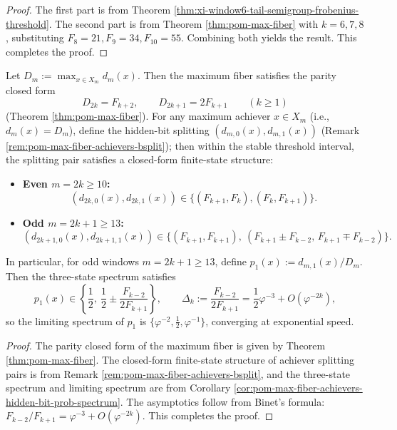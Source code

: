 \begin{proof}
The first part is from Theorem \ref{thm:xi-window6-tail-semigroup-frobenius-threshold}.
The second part is from Theorem \ref{thm:pom-max-fiber} with \(k=6,7,8\), substituting \(F_8=21,F_9=34,F_{10}=55\).
Combining both yields the result. This completes the proof.
\end{proof}

\begin{corollary}\label{cor:xi-max-fiber-parity-hiddenbit-finite-spectrum}
Let \(D_m:=\max_{x\in X_m}d_m(x)\).
Then the maximum fiber satisfies the parity closed form
\[
D_{2k}=F_{k+2},\qquad D_{2k+1}=2F_{k+1}
\qquad(k\ge 1)
\]
(Theorem \ref{thm:pom-max-fiber}).
For any maximum achiever \(x\in X_m\) (i.e., \(d_m(x)=D_m\)), define the hidden-bit splitting \((d_{m,0}(x),d_{m,1}(x))\) (Remark \ref{rem:pom-max-fiber-achievers-bsplit}); then within the stable threshold interval, the splitting pair satisfies a closed-form finite-state structure:
\begin{itemize}
  \item \textbf{Even \(m=2k\ge 10\):}
  \[
  (d_{2k,0}(x),d_{2k,1}(x))\in\{(F_{k+1},F_k),(F_k,F_{k+1})\}.
  \]
  \item \textbf{Odd \(m=2k+1\ge 13\):}
  \[
  (d_{2k+1,0}(x),d_{2k+1,1}(x))\in\{(F_{k+1},F_{k+1}),\ (F_{k+1}\pm F_{k-2},\,F_{k+1}\mp F_{k-2})\}.
  \]
\end{itemize}
In particular, for odd windows \(m=2k+1\ge 13\), define
\(
p_1(x):=d_{m,1}(x)/D_m
\).
Then the three-state spectrum satisfies
\[
p_1(x)\in\left\{\frac12,\ \frac12\pm\frac{F_{k-2}}{2F_{k+1}}\right\},
\qquad
\Delta_k:=\frac{F_{k-2}}{2F_{k+1}}=\frac12\varphi^{-3}+O(\varphi^{-2k}),
\]
so the limiting spectrum of \(p_1\) is \(\{\varphi^{-2},\tfrac12,\varphi^{-1}\}\), converging at exponential speed.
\end{corollary}

\begin{proof}
The parity closed form of the maximum fiber is given by Theorem \ref{thm:pom-max-fiber}.
The closed-form finite-state structure of achiever splitting pairs is from Remark \ref{rem:pom-max-fiber-achievers-bsplit}, and the three-state spectrum and limiting spectrum are from Corollary \ref{cor:pom-max-fiber-achievers-hidden-bit-prob-spectrum}.
The asymptotics follow from Binet's formula: \(F_{k-2}/F_{k+1}=\varphi^{-3}+O(\varphi^{-2k})\). This completes the proof.
\end{proof}

